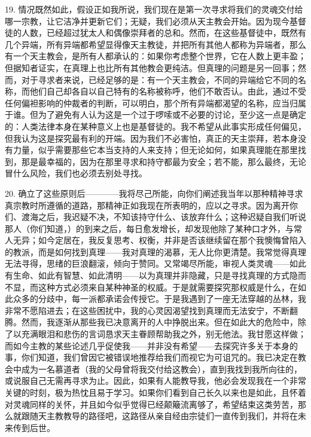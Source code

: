 19. 情况既然如此，假设正如我所说，我们现在是第一次寻求将我们的灵魂交付给哪一宗教，让它洁净并更新它们；无疑，我们必须从天主教会开始。因为现今基督徒的人数，已经超过犹太人和偶像崇拜者的总和。然而，在这些基督徒中，既然有几个异端，所有异端都希望显得像天主教徒，并把所有其他人都称为异端者，那么有一个天主教会，是所有人都承认的：如果你考虑整个世界，它在人数上更丰盈；但据知者证实，在真理上也比所有其他教会更纯洁。但真理的问题是另一回事；然而，对于寻求者来说，已经足够的是：有一个天主教会，不同的异端给它不同的名称，而他们自己却各自以自己特有的名称被称呼，他们不敢否认。由此，通过不受任何偏袒影响的仲裁者的判断，可以明白，那个所有异端都渴望的名称，应当归属于谁。但为了避免有人认为这是一个过于啰嗦或不必要的讨论，至少这一点是确定的：人类法律本身在某种意义上也是基督徒的。我不希望从此事实形成任何偏见，但我认为这是探究最有利的开端。因为我们不必害怕，真正的天主崇拜，若本身没有力量，似乎需要那些它本当支持的人来支持；但无论如何，如果真理能在那里找到，那是最幸福的，因为在那里寻求和持守都最为安全；若不能，那么最终，无论冒什么风险，我们也必须去别处寻找。\par

20. 确立了这些原则后————我将尽己所能，向你们阐述我当年以那种精神寻求真宗教时所遵循的道路，那精神正如我现在所表明的，应以之寻求。因为离开你们、渡海之后，我迟疑不决，不知该持守什么、该放弃什么；这种迟疑自我们听说那人（你们知道，）的到来之后，每日愈发增长，却发现他除了某种口才外，与常人无异；如今定居在，我反复思考、权衡，并非是否该继续留在那个我懊悔曾陷入的教派，而是如何找到真理——我对真理的渴慕，无人比你更清楚。我常觉得真理无法寻得，思绪的巨浪翻滚，倾向于赞同。又常竭尽所能，审视人类灵魂——如此有生命、如此有智慧、如此清明——以为真理并非隐藏，只是寻找真理的方式隐而不显，而这种方式必须来自某种神圣的权威。于是就需要探究那权威是什么，在如此众多的分歧中，每一派都承诺会传授它。于是我遇到了一座无法穿越的丛林，我非常不愿陷进去；在这些困扰中，我的心灵因渴望找到真理而无法安宁，不断翻腾。然而，我逐渐从那些我已决意离开的人中挣脱出来。但在如此大的危险中，除了以充满眼泪和悲伤的言词恳求天主眷顾帮助我之外，别无他法。我甘愿这样做；而如今主教的某些论述几乎促使我——并非没有希望——去探究许多关于本身的事，你们知道，我们曾因它被错误地推荐给我们而视它为可诅咒的。我已决定在教会中成为一名慕道者（我的父母曾将我交付给这教会），直到我找到我所向往的，或说服自己无需再寻求为止。因此，如果有人能教导我，他必会发现我在一个非常关键的时刻，极为热忱且易于学习。如果你们看到自己长久以来也是如此，且怀着对灵魂同样的关怀，并且如今似乎觉得已经颠簸流离够了，希望结束这类劳苦，那么就跟随天主教教导的路径吧，这路径从亲自经由宗徒们一直传到我们，并将在未来传到后世。\par

